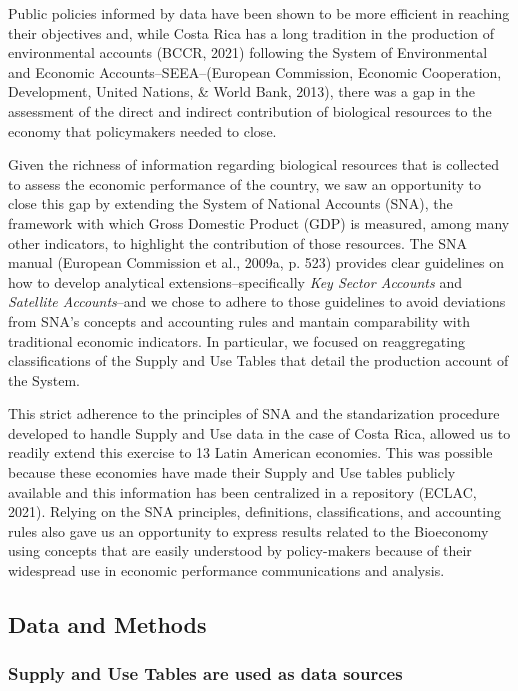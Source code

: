 \documentclass[
  letterpaper,
  DIV=11,
  numbers=noendperiod]{scrartcl}
\begin{document}
Public policies informed by data have been shown to be more efficient in
reaching their objectives and, while Costa Rica has a long tradition in
the production of environmental accounts (BCCR, 2021) following the
System of Environmental and Economic Accounts--SEEA--(European
Commission, Economic Cooperation, Development, United Nations, \& World
Bank, 2013), there was a gap in the assessment of the direct and
indirect contribution of biological resources to the economy that
policymakers needed to close.

Given the richness of information regarding biological resources that is
collected to assess the economic performance of the country, we saw an
opportunity to close this gap by extending the System of National
Accounts (SNA), the framework with which Gross Domestic Product (GDP) is
measured, among many other indicators, to highlight the contribution of
those resources. The SNA manual (European Commission et al., 2009a, p.
523) provides clear guidelines on how to develop analytical
extensions--specifically \emph{Key Sector Accounts} and \emph{Satellite
Accounts}--and we chose to adhere to those guidelines to avoid
deviations from SNA's concepts and accounting rules and mantain
comparability with traditional economic indicators. In particular, we
focused on reaggregating classifications of the Supply and Use Tables
that detail the production account of the System.

This strict adherence to the principles of SNA and the standarization
procedure developed to handle Supply and Use data in the case of Costa
Rica, allowed us to readily extend this exercise to 13 Latin American
economies. This was possible because these economies have made their
Supply and Use tables publicly available and this information has been
centralized in a repository (ECLAC, 2021). Relying on the SNA
principles, definitions, classifications, and accounting rules also gave
us an opportunity to express results related to the Bioeconomy using
concepts that are easily understood by policy-makers because of their
widespread use in economic performance communications and analysis.

\subsection{Data and Methods}\label{data-and-methods}

\subsubsection{Supply and Use Tables are used as data
sources}\label{supply-and-use-tables-are-used-as-data-sources}
\end{document}

